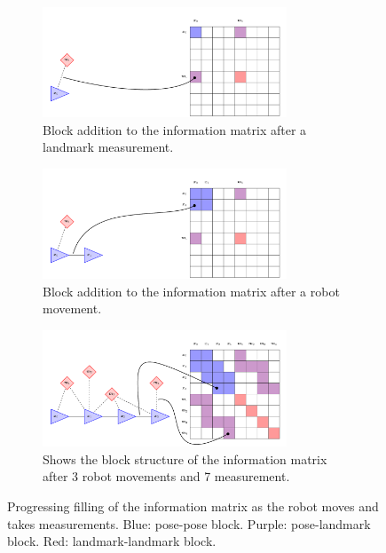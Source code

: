 \begin{figure}[htbp!]
    \newcommand{\figScale}{0.8}
    \centering
    \begin{subfigure}[htbp!]{\textwidth}
        \centering
        \includegraphics[width=\figScale\textwidth]{tikz/matrix1.pdf}
        \caption{Block addition to the information matrix after a landmark measurement.}
        \label{fig:matrix1}
    \end{subfigure}
    \begin{subfigure}[htbp!]{\textwidth}
        \centering
        \includegraphics[width=\figScale\textwidth]{tikz/matrix2.pdf}
        \caption{Block addition to the information matrix after a robot movement.}
        \label{fig:matrix2}
    \end{subfigure}
    \begin{subfigure}[htbp!]{\textwidth}
        \centering
        \includegraphics[width=\figScale\textwidth]{tikz/matrix3-cropped.pdf}
        \caption{Shows the block structure of the information matrix after 3 robot movements and 7 measurement.}
        \label{fig:matrix3}
    \end{subfigure}
    \caption[Information matrix structure]{Progressing filling of the information matrix as the robot moves and takes measurements. Blue: pose-pose block. Purple: pose-landmark block. Red: landmark-landmark block.}
    \label{fig:information-matrix}
\end{figure}

